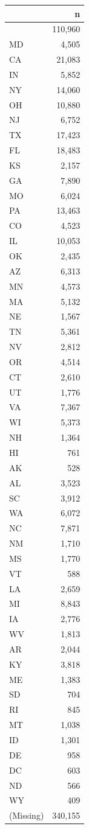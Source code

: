 \documentclass[10pt,article,oneside]{memoir}
\begin{document}
\begin{table}[H]
\centering
\begin{tabular}[t]{lr}
\toprule
 & n\\
\midrule
 & 110,960\\
MD & 4,505\\
CA & 21,083\\
IN & 5,852\\
NY & 14,060\\
OH & 10,880\\
NJ & 6,752\\
TX & 17,423\\
FL & 18,483\\
KS & 2,157\\
GA & 7,890\\
MO & 6,024\\
PA & 13,463\\
CO & 4,523\\
IL & 10,053\\
OK & 2,435\\
AZ & 6,313\\
MN & 4,573\\
MA & 5,132\\
NE & 1,567\\
TN & 5,361\\
NV & 2,812\\
OR & 4,514\\
CT & 2,610\\
UT & 1,776\\
VA & 7,367\\
WI & 5,373\\
NH & 1,364\\
HI & 761\\
AK & 528\\
AL & 3,523\\
SC & 3,912\\
WA & 6,072\\
NC & 7,871\\
NM & 1,710\\
MS & 1,770\\
VT & 588\\
LA & 2,659\\
MI & 8,843\\
IA & 2,776\\
WV & 1,813\\
AR & 2,044\\
KY & 3,818\\
ME & 1,383\\
SD & 704\\
RI & 845\\
MT & 1,038\\
ID & 1,301\\
DE & 958\\
DC & 603\\
ND & 566\\
WY & 409\\
(Missing) & 340,155\\
\bottomrule
\end{tabular}
\end{table}
\end{document}
